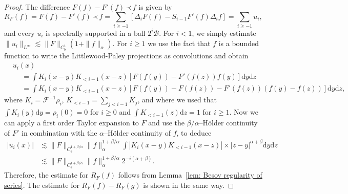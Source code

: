 \documentclass[a4paper,11pt]{article}
\newcommand{\mathd}{\mathrm{d}}
\theoremstyle{remark}
\newcommand{\CB}{\ensuremath{\mathscr{B}}}
\newcommand{\CF}{\ensuremath{\mathscr{F}}}
\newcommand{\lpara}{\,\mathord{\prec}\,}
\begin{document}
\begin{proof}
   The difference $F(f) - F'(f)\lpara f$ is given by
   \[
      R_F(f) = F(f) - F'(f)\lpara f = \sum_{i \geqslant -1} [\Delta_i F(f) - S_{i-1} F'(f) \Delta_i f] = \sum_{i \geqslant -1} u_i,
   \]
   and every $u_i$ is spectrally supported in a ball $2^i \CB$. For $i<1$, we simply estimate $\| u_i\|_{L^\infty} \lesssim \|F\|_{C^1_b}(1+\|f\|_\alpha)$. For $i \geqslant 1$ we use the fact that $f$ is a bounded function to write the Littlewood-Paley projections as convolutions and obtain
  \begin{align*}
     &u_i ( x ) \\
     &\hspace{15pt} = \int K_{i} ( x-y ) K_{<i-1} ( x-z ) [F ( f ( y) ) - F'(f(z)) f(y)] \mathd y \mathd z \\
     &\hspace{15pt} = \int K_{i} ( x-y ) K_{<i-1} ( x-z ) [ F ( f ( y ) ) -F ( f ( z ) ) - F'(f(z)) (f(y) - f(z)) ] \mathd y \mathd z,
  \end{align*}
  where $K_{i} = \CF^{-1} \rho_{i}$, $K_{<i-1} = \sum_{j<i-1} K_{j}$,
  and where we used that $\int K_{i} ( y ) \mathd y= \rho_{i} ( 0 ) =0$ for $i \geqslant 0$ and $\int K_{<i-1} ( z ) \mathd z=1$ for $i \geqslant 1$. Now we can apply a first order Taylor expansion to $F$ and use the $\beta/\alpha$--H\"older continuity of $F'$ in combination with the $\alpha$--H\"older continuity of $f$, to deduce
  \begin{align*}
     |u_i(x)| & \lesssim \|F\|_{C^{1+\beta/\alpha}_b} \|f\|_\alpha^{1+\beta/\alpha} \int |K_{i} ( x-y ) K_{<i-1} ( x-z )| \times |z-y|^{\alpha+\beta} \mathd y \mathd z \\
     & \lesssim \|F\|_{C^{1+\beta/\alpha}_b} \|f\|_\alpha^{1+\beta/\alpha} 2^{-i(\alpha+\beta)}.
  \end{align*}
  Therefore, the estimate for $R_F(f)$ follows from Lemma~\ref{lem: Besov regularity of series}. The estimate for $R_F(f) - R_F(g)$ is shown in the same way.
%  

\end{proof}
\end{document}
